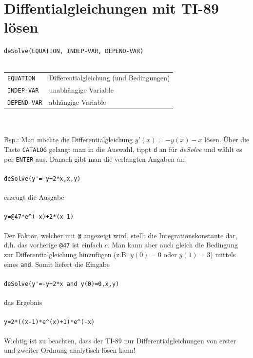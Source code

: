 \section{Diffentialgleichungen mit TI-89 lösen}
\verb?deSolve(EQUATION, INDEP-VAR, DEPEND-VAR)? \\\\
\begin{tabular}{@{}ll}
	\verb?EQUATION?
		& Differentialgleichung (und Bedingungen) \\
	\verb?INDEP-VAR?
		& unabhängige Variable \\
	\verb?DEPEND-VAR?
		& abhängige Variable \\
\end{tabular}\\\\
Bsp.: Man möchte die Differentialgleichung $y'(x)=-y(x)-x$ lösen.
Über die Taste \verb?CATALOG? gelangt man in die Auswahl, tippt \verb?d?
an für \textit{deSolve} und wählt es per \verb?ENTER? aus.
Danach gibt man die verlangten Angaben an:\\\\
\indent
\verb?deSolve(y'=-y+2*x,x,y)?\\\\ 
erzeugt die Ausgabe \\\\
\indent
\verb?y=@47*e^(-x)+2*(x-1)? \\\\
Der Faktor, welcher mit \verb?@? angezeigt wird, stellt die 
Integrationskonstante dar, d.h. das vorherige \verb?@47? ist einfach $c$.
Man kann aber auch gleich die Bedingung zur Differentialgleichung 
hinzufügen (z.B. $y(0)=0$ oder $y(1)=3$) mittels eines \verb?and?.
Somit liefert die Eingabe \\\\
\indent
\verb?deSolve(y'=-y+2*x and y(0)=0,x,y)? \\\\
das Ergebnis \\\\
\indent
\verb?y=2*((x-1)*e^(x)+1)*e^(-x)?\\\\
Wichtig ist zu beachten, dass der TI-89 nur Differentialgleichungen
von erster und zweiter Ordnung analytisch lösen kann!
\fi
